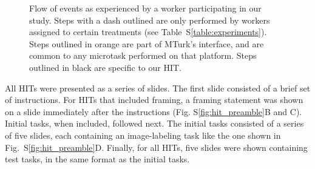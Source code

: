 \documentclass[12pt]{article}
\begin{document}
\begin{figure}
\begin{center}
	\caption{Flow of events as experienced by a worker participating in
		our study.  Steps with a dash outlined are only performed by 
		workers assigned to certain treatments 
		(see Table~S\ref{table:experiments}).  Steps outlined in orange are
		part of MTurk's interface, and are common to any 
		microtask performed on that platform.  Steps outlined in black are
		specific to our HIT.
	}
	\label{fig:task_schematic}
	\end{center}
\end{figure}

All HITs were presented as a series of slides.  The first 
slide consisted of a brief set of instructions.  For HITs that included 
framing, a framing statement was shown on a slide immediately after the 
instructions (Fig. S\ref{fig:hit_preamble}B and C).  
Initial tasks, when included, followed next.  The initial tasks consisted of 
a series of five slides, each containing an image-labeling task like the one 
shown in 
Fig.~S\ref{fig:hit_preamble}D.  Finally, for all HITs, five slides were shown
containing test tasks, in the same format as the initial tasks.
\end{document}
